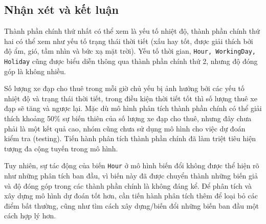 \subsection*{Nhận xét và kết luận}

Thành phần chính thứ nhất có thể xem là yếu tố nhiệt độ, thành phần chính thứ hai có thể xem như yếu tố trạng thái thời tiết (xấu hay tốt, được giải thích bởi độ ẩm, gió, tầm nhìn và bức xạ mặt trời). Yếu tố thời gian, \texttt{Hour, WorkingDay, Holiday} cũng được biểu diễn thông qua thành phần chính thứ 2, nhưng độ đóng góp là không nhiều. 

Số lượng xe đạp cho thuê trong mỗi giờ chủ yếu bị ảnh hưởng bởi các yếu tố nhiệt độ và trạng thái thời tiết, trong điều kiện thời tiết tốt thì số lượng thuê xe đạp sẽ tăng và ngược lại.
Mặc dù mô hình phân tích thành phần chính có thể giải thích khoảng 50\% sự biến thiên của số lượng xe đạp cho thuê, nhưng đây chưa phải là một kết quả cao, nhóm cũng chưa sử dụng mô hình cho việc dự đoán kiểm tra (testing). Tiến hành phân tích thành phần chính đã làm triệt tiêu hiện tượng đa cộng tuyến trong mô hình. 

Tuy nhiên, sự tác động của biến \texttt{Hour} ở mô hình biến đổi không được thể hiện rõ như những phân tích ban đầu, vì biến này đã được chuyển thành những biến giả và độ đóng góp trong các thành phần chính là không đáng kể. Để phân tích và xây dựng mô hình dự đoán tốt hơn, cần tiến hành phân tích thêm để loại bỏ các điểm bất thường, cũng như tìm cách xây dựng/biến đổi những biến ban đầu một cách hợp lý hơn.